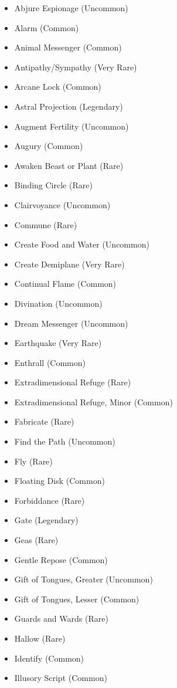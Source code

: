 \begin{itemize}
    \item Abjure Espionage (Uncommon)
    \item Alarm (Common)
    \item Animal Messenger (Common)
    \item Antipathy/Sympathy (Very Rare)
    \item Arcane Lock (Common)
    \item Astral Projection (Legendary)
    \item Augment Fertility (Uncommon)
    \item Augury (Common)
    \item Awaken Beast or Plant (Rare)
    \item Binding Circle (Rare)
    \item Clairvoyance (Uncommon)
    \item Commune (Rare)
    \item Create Food and Water (Uncommon)
	\item Create Demiplane (Very Rare)
    \item Continual Flame (Common)
    \item Divination (Uncommon)
    \item Dream Messenger (Uncommon)
    \item Earthquake (Very Rare)
    \item Enthrall (Common)
    \item Extradimensional Refuge (Rare)
    \item Extradimensional Refuge, Minor (Common)
    \item Fabricate (Rare)
    \item Find the Path (Uncommon)
    \item Fly (Rare)
    \item Floating Disk (Common)
    \item Forbiddance (Rare)
    \item Gate (Legendary)
    \item Geas (Rare)
    \item Gentle Repose (Common)    
    \item Gift of Tongues, Greater (Uncommon)
    \item Gift of Tongues, Lesser (Common)
    \item Guards and Wards (Rare)
    \item Hallow (Rare)
    \item Identify (Common)
    \item Illusory Script (Common)

\end{itemize}
